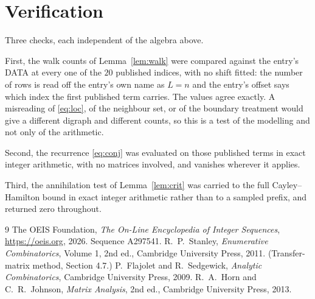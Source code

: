 \documentclass[11pt,a4paper]{article}
\theoremstyle{plain}
\theoremstyle{definition}
\begin{document}
\section{Verification}

Three checks, each independent of the algebra above.

First, the walk counts of Lemma~\ref{lem:walk} were compared against the entry's DATA at
every one of the $20$ published indices, with no shift fitted: the number of rows is
read off the entry's own name as $L=n$ and the entry's offset says which index the first
published term carries. The values agree exactly. A misreading of \eqref{eq:loc}, of the
neighbour set, or of the boundary treatment would give a different digraph and different
counts, so this is a test of the modelling and not only of the arithmetic.

Second, the recurrence \eqref{eq:conj} was evaluated on those published terms in exact
integer arithmetic, with no matrices involved, and vanishes wherever it applies.

Third, the annihilation test of Lemma~\ref{lem:crit} was carried to the full
Cayley--Hamilton bound in exact integer arithmetic rather than to a sampled prefix, and
returned zero throughout.

\begin{thebibliography}{9}
 The OEIS Foundation, \emph{The On-Line Encyclopedia of Integer
Sequences}, \url{https://oeis.org}, 2026. Sequence A297541.
 R.~P.~Stanley, \emph{Enumerative Combinatorics}, Volume 1, 2nd ed.,
Cambridge University Press, 2011. (Transfer-matrix method, Section 4.7.)
 P.~Flajolet and R.~Sedgewick, \emph{Analytic Combinatorics}, Cambridge
University Press, 2009.
 R.~A.~Horn and C.~R.~Johnson, \emph{Matrix Analysis}, 2nd ed., Cambridge
University Press, 2013.
\end{thebibliography}
\end{document}
